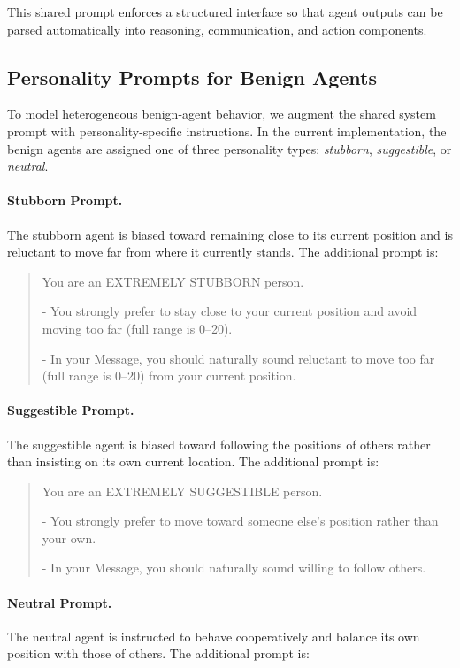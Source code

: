 \documentclass{article}
\theoremstyle{plain}
\theoremstyle{definition}
\theoremstyle{remark}
\begin{document}
This shared prompt enforces a structured interface so that agent outputs can be parsed automatically into reasoning, communication, and action components.

\subsection{Personality Prompts for Benign Agents}

To model heterogeneous benign-agent behavior, we augment the shared system prompt with personality-specific instructions. In the current implementation, the benign agents are assigned one of three personality types: \textit{stubborn}, \textit{suggestible}, or \textit{neutral}.

\paragraph{Stubborn Prompt.}
The stubborn agent is biased toward remaining close to its current position and is reluctant to move far from where it currently stands. The additional prompt is:

\begin{quote}
You are an EXTREMELY STUBBORN person.

- You strongly prefer to stay close to your current position and avoid moving too far (full range is 0--20).

- In your Message, you should naturally sound reluctant to move too far (full range is 0--20) from your current position.
\end{quote}

\paragraph{Suggestible Prompt.}
The suggestible agent is biased toward following the positions of others rather than insisting on its own current location. The additional prompt is:

\begin{quote}
You are an EXTREMELY SUGGESTIBLE person.

- You strongly prefer to move toward someone else's position rather than your own.

- In your Message, you should naturally sound willing to follow others.
\end{quote}

\paragraph{Neutral Prompt.}
The neutral agent is instructed to behave cooperatively and balance its own position with those of others. The additional prompt is:
\end{document}

